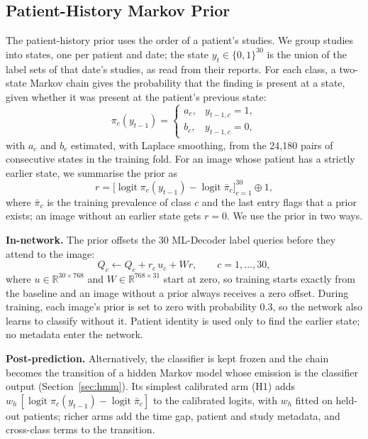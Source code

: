 \documentclass[conference]{IEEEtran}
\begin{document}
\subsection{Patient-History Markov Prior}
\label{sec:phprior}
The patient-history prior uses the order of a patient's studies. We group studies into states, one per patient and date; the state $y_t \in \{0,1\}^{30}$ is the union of the label sets of that date's studies, as read from their reports. For each class, a two-state Markov chain gives the probability that the finding is present at a state, given whether it was present at the patient's previous state:
\begin{equation}
\pi_c(y_{t-1}) = \begin{cases} a_c, & y_{t-1,c} = 1,\\ b_c, & y_{t-1,c} = 0, \end{cases}
\label{eq:chain}
\end{equation}
with $a_c$ and $b_c$ estimated, with Laplace smoothing, from the 24,180 pairs of consecutive states in the training fold. For an image whose patient has a strictly earlier state, we summarise the prior as
\begin{equation}
r = \bigl[\operatorname{logit} \pi_c(y_{t-1}) - \operatorname{logit} \bar\pi_c\bigr]_{c=1}^{30} \oplus 1,
\label{eq:rvec}
\end{equation}
where $\bar\pi_c$ is the training prevalence of class $c$ and the last entry flags that a prior exists; an image without an earlier state gets $r = 0$. We use the prior in two ways.

\textbf{In-network.} The prior offsets the 30 ML-Decoder label queries before they attend to the image:
\begin{equation}
Q_c \leftarrow Q_c + r_c\, u_c + W r, \qquad c = 1, \dots, 30,
\label{eq:qprior}
\end{equation}
where $u \in \mathbb{R}^{30 \times 768}$ and $W \in \mathbb{R}^{768 \times 31}$ start at zero, so training starts exactly from the baseline and an image without a prior always receives a zero offset. During training, each image's prior is set to zero with probability 0.3, so the network also learns to classify without it. Patient identity is used only to find the earlier state; no metadata enter the network.

\textbf{Post-prediction.} Alternatively, the classifier is kept frozen and the chain becomes the transition of a hidden Markov model whose emission is the classifier output (Section~\ref{sec:hmm}). Its simplest calibrated arm (H1) adds $w_h\,[\operatorname{logit} \pi_c(y_{t-1}) - \operatorname{logit} \bar\pi_c]$ to the calibrated logits, with $w_h$ fitted on held-out patients; richer arms add the time gap, patient and study metadata, and cross-class terms to the transition.
\end{document}
